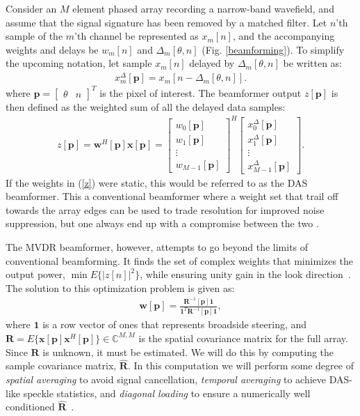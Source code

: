 \documentclass[12pt,journal,captionsoff,onecolumn]{IEEEtran}
\newcommand\bmat[1]{\begin{bmatrix}#1\end{bmatrix}}
\newcommand\T{^{\scriptscriptstyle T}}
\renewcommand\H{^{\scriptscriptstyle H}}
\renewcommand\vec[1]{\boldsymbol{#1}}
\newcommand\mat[1]{\boldsymbol{#1}}
\newcommand\1{\vec 1}
\newcommand*\p{\vec p}
\newcommand*\w{\vec w}
\newcommand*\x{\vec x}
\newcommand*\R{\mat R}
\newcommand*\Ri{\R^{-1}}
\newcommand*\eR{\mat{\hat R}}
\begin{document}
Consider an $M$ element phased array recording a narrow-band wavefield, and assume that the signal signature has been removed by a matched filter. Let $n$'th sample of the $m$'th channel be represented as $x_m[n]$, and the accompanying weights and delays be  $w_m[n]$ and $\Delta_m[\theta,n]$ (Fig. \ref{beamforming}). To simplify the upcoming notation, let sample $x_m[n]$ delayed by $\Delta_m[\theta,n]$ be written as:
\begin{align}
x^\Delta_m[\p] = x_m[n-\Delta_m[\theta,n]].
\end{align}
where $\p = \bmat{\theta & n}\T$ is the pixel of interest. The beamformer output $z[\p]$ is then defined as the weighted sum of all the delayed data samples:
\begin{align}
z[\p] = \w\H[\p]\x[\p] = \bmat{w_0[\p]\\w_1[\p]\\\vdots\\w_{M-1}[\p]}^H \bmat{x^\Delta_0[\p]\\x^\Delta_1[\p]\\\vdots\\x^\Delta_{M-1}[\p]}.\label{z}
\end{align}
If the weights in (\ref{z}) were static, this would be referred to as the \gls{DAS} beamformer. This a conventional beamformer where a weight set that trail off towards the array edges can be used to trade resolution for improved noise suppression, but one always end up with a compromise between the two \cite{Harris1978}.

The \gls{MVDR} beamformer, however, attempts to go beyond the limits of conventional beamforming. It finds the set of complex weights that minimizes the output power, $\min E\{|z[n]|^2\}$, while ensuring unity gain in the look direction~\cite{Capon1969}. The solution to this optimization problem is given as:
\begin{gather}
\vec w[\p] = \frac{\Ri[\p]\1}{\1\T\Ri[\p]\1},\label{weights}
\end{gather}
where $\1$ is a row vector of ones that represents broadside steering, and $\R=E\{\x[\p]\x\H[\p]\} \in\mathbb{C}^{M,M}$ is the spatial covariance matrix for the full array. Since $\R$ is unknown, it must be estimated. We will do this by computing the sample covariance matrix, $\eR$. In this computation we will perform some degree of \emph{spatial averaging} to avoid signal cancellation, \emph{temporal averaging} to achieve \gls{DAS}-like speckle statistics, and \emph{diagonal loading} to ensure a numerically well conditioned $\eR$~\cite{Synnevag2009a}.
\end{document}

